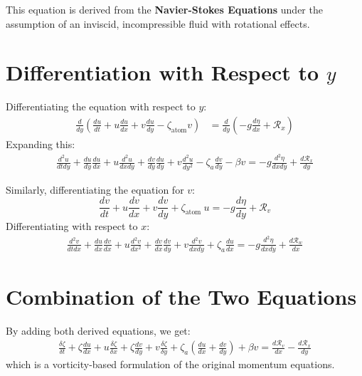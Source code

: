     This equation is derived from the \textbf{Navier-Stokes Equations} under the assumption of an inviscid, incompressible fluid with rotational effects.

    \section{Differentiation with Respect to $y$}
    Differentiating the equation with respect to $y$:
    \begin{align}
        \frac{d}{dy} \left( \frac{d u}{d t} + u \frac{d u}{d x} + v \frac{d u}{d y} - \zeta_{\text{atom}} v \right) &= \frac{d}{dy} \left( - g \frac{d \eta}{d x} + \mathcal{R}_x \right)
    \end{align}
    Expanding this:
    \begin{align}
        \frac{d^2 u}{d t d y}+\frac{d u}{d y} \frac{d u}{d x}+u \frac{d^2 u}{d x d y}+\frac{d v}{d y} \frac{d u}{d y}+v \frac{d^2 u}{d y^2}-\zeta_a \frac{d v}{d y}-\beta v=-g \frac{d^2 \eta}{d x d y}+\frac{d \mathcal{R}_x}{d y}
    \end{align}

    Similarly, differentiating the equation for $v$:
    \begin{equation}
        \frac{d v}{d t}+u \frac{d v}{d x}+v \frac{d v}{d y}+\zeta_{\text {atom }} u=-g \frac{d \eta}{d y}+\mathcal{R}_v
    \end{equation}
    Differentiating with respect to $x$:
    \begin{align}
        \frac{d^2 v}{d t d x}+\frac{d u}{d x} \frac{d v}{d x}+u \frac{d^2 v}{d x^2}+\frac{d v}{d x} \frac{d v}{d y}+v \frac{d^2 v}{d x d y}+\zeta_a \frac{d u}{d x}=-g \frac{d^2 \eta}{d x d y}+\frac{d \mathcal{R}_w}{d x}
    \end{align}

    \section{Combination of the Two Equations}
    By adding both derived equations, we get:
    \begin{align}
        \frac{\delta \zeta}{\delta t}+\zeta \frac{d u}{d x}+u \frac{\delta \zeta}{\delta x}+\zeta \frac{d v}{d y}+v \frac{\delta \zeta}{\delta y}+\zeta_a\left(\frac{d u}{d x}+\frac{d v}{d y}\right)+\beta v=\frac{d \mathcal{R}_v}{d x}-\frac{d \mathcal{R}_x}{d y}
    \end{align}
    which is a vorticity-based formulation of the original momentum equations.

